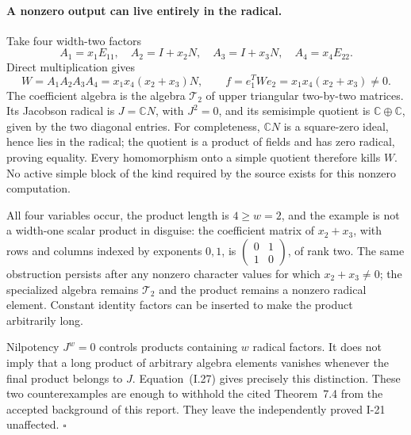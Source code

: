 \paragraph{A nonzero output can live entirely in the radical.}
Take four width-two factors
\[
 A_1=x_1E_{11},\quad A_2=I+x_2N,\quad
 A_3=I+x_3N,\quad A_4=x_4E_{22}.
\]
Direct multiplication gives
\[
 W=A_1A_2A_3A_4=x_1x_4(x_2+x_3)N,\qquad
 f=e_1^TWe_2=x_1x_4(x_2+x_3)\ne0.
 \tag{I.27}
\]
The coefficient algebra is the algebra $\mathcal T_2$ of upper
triangular two-by-two matrices.  Its Jacobson radical is
$J=\mathbb C N$, with $J^2=0$, and its semisimple quotient is
$\mathbb C\oplus\mathbb C$, given by the two diagonal entries.
For completeness, $\mathbb C N$ is a square-zero ideal, hence
lies in the radical; the quotient is a product of fields and
has zero radical, proving equality.  Every homomorphism onto
a simple quotient therefore kills $W$.  No active simple block
of the kind required by the source exists for this nonzero
computation.

All four variables occur, the product length is $4\ge w=2$,
and the example is not a width-one scalar product in disguise:
the coefficient matrix of $x_2+x_3$, with rows and columns
indexed by exponents $0,1$, is
$\left(\begin{smallmatrix}0&1\\1&0\end{smallmatrix}\right)$,
of rank two.  The same obstruction persists after any nonzero
character values for which $x_2+x_3\ne0$; the specialized
algebra remains $\mathcal T_2$ and the product remains a
nonzero radical element.  Constant identity factors can be
inserted to make the product arbitrarily long.

Nilpotency $J^w=0$ controls products containing $w$ radical
factors.  It does not imply that a long product of arbitrary
algebra elements vanishes whenever the final product belongs
to $J$.  Equation~(I.27) gives precisely this distinction.
These two counterexamples are enough to withhold the cited
Theorem~7.4 from the accepted background of this report.
They leave the independently proved I-21 unaffected.
\hfill$\square$
